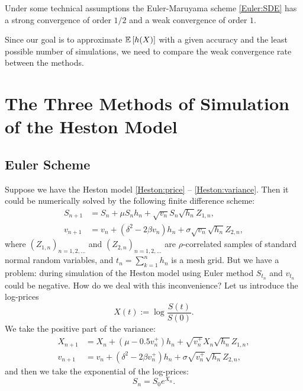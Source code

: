                 \begin{theorem}
                    Under some technical assumptions the Euler-Maruyama scheme \eqref{Euler:SDE} has a strong convergence of order $1/2$ and a weak convergence of order $1$.
                \end{theorem}
            
                Since our goal is to approximate $\mathbb{E}\left[h(X)\right]$ with a given accuracy and the least possible number of simulations, we need to compare the weak convergence rate between the methods.
                
                

\chapter{The Three Methods of Simulation of the Heston Model}
    \section{Euler Scheme}
        Suppose we have the Heston model \eqref{Heston:price} -- \eqref{Heston:variance}. Then it could be numerically solved by the following finite difference scheme:
        \begin{align}
            S_{n+1} & = S_n + \mu S_n h_n + \sqrt{v_n} S_n \sqrt{h_n} Z_{1,n}, \label{Euler:Heston:price}\\
            v_{n+1} & = v_n + \left(\delta^2 - 2\beta v_n\right) h_n + \sigma \sqrt{v_n} \sqrt{h_n} Z_{2,n}, \label{Euler:Heston:variance}
        \end{align}
        where $(Z_{1,n})_{n=1, 2, \dots}$ and $(Z_{2,n})_{n=1, 2, \dots}$ are $\rho$-correlated samples of standard normal random variables, and $t_n = \sum_{k=1}^n h_n$ is a mesh grid.
        But we have a problem: during simulation of the Heston model using Euler method $S_{t_n}$ and $v_{t_n}$ could be negative. How do we deal with this inconvenience?
        Let us introduce the log-prices
        \begin{equation}
            X(t) := \log\frac{S(t)}{S(0)}.
        \end{equation}
        We take the positive part of the variance:
        \begin{align}
            X_{n+1} & = X_n + (\mu - 0.5 v_n^+)h_n + \sqrt{v_n^+} X_n \sqrt{h_n} Z_{1,n}, \label{Euler:Heston:price:posmod}\\
            v_{n+1} & = v_n + \left(\delta^2 - 2\beta v_n^+\right) h_n + \sigma \sqrt{v_n^+} \sqrt{h_n} Z_{2,n}, \label{Euler:Heston:variance:posmod}
        \end{align}
        and then we take the exponential of the log-prices:
        \begin{equation}
            S_{n} = S_0 e^{X_{n}}.
        \end{equation}
        
